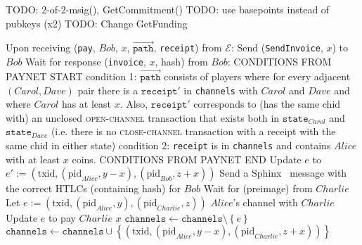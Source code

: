 \begin{algorithmic}[1]
    \State TODO: 2-of-2-msig(), GetCommitment()
    \State TODO: use basepoints instead of pubkeys (x2)
    \State TODO: Change GetFunding
    \State

    \State Upon receiving (\texttt{pay}, $Bob$, $x$,
    $\overrightarrow{\mathtt{path}}$, \texttt{receipt}) from $\mathcal{E}$:
      \State Send (\texttt{SendInvoice}, $x$) to $Bob$
      \State Wait for response (\texttt{invoice}, $x$, hash) from $Bob$:
      \Indent
        \State CONDITIONS FROM PAYNET START
        \State condition 1: $\overrightarrow{\mathtt{path}}$ consists of players
        where for every adjacent $\left(Carol, Dave\right)$ pair there is a
        $\mathtt{receipt}'$ in \texttt{channels} with $Carol$ and $Dave$ and
        where $Carol$ has at least $x$. Also, $\mathtt{receipt}'$ corresponds to
        (has the same chid with) an unclosed \textsc{open-channel} transaction
        that exists both in $\mathtt{state}_{Carol}$ and $\mathtt{state}_{Dave}$
        (i.e. there is no \textsc{close-channel} transaction with a receipt with
        the same chid in either state)
        \State condition 2: \texttt{receipt} is in \texttt{channels} and
        contains $Alice$ with at least $x$ coins.
        \State CONDITIONS FROM PAYNET END
      \EndIndent
        \State Update $e$ to $e' := \left(\mathrm{txid},
        \left(\mathrm{pid}_{Alice}, y - x\right),
        \left(\mathrm{pid}_{Bob}, z + x\right)\right)$ 
        \State Send a Sphinx~\cite{sphinx} message with the correct HTLCs
        (containing hash) for $Bob$
        \State {}
        \State Wait for (preimage) from $Charlie$
          \State Let $e := \left(\mathrm{txid}, \left(\mathrm{pid}_{Alice},
          y\right), \left(\mathrm{pid}_{Charlie}, z\right)\right)$ $Alice$'s
          channel with $Charlie$
          \State Update $e$ to pay $Charlie$ $x$ 
          \State $\mathtt{channels} \gets \mathtt{channels} \setminus
          \left\{e\right\}$
          \State $\mathtt{channels} \gets \mathtt{channels} \cup
          \left\{\left(\mathrm{txid},
          \left(\mathrm{pid}_{Alice}, y - x\right),
          \left(\mathrm{pid}_{Charlie}, z + x\right)\right)\right\}$

\end{algorithmic}

